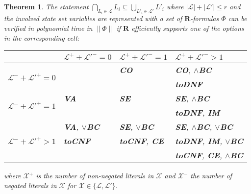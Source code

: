 \documentclass{article}
\newtheorem{theorem}{Theorem}
\newcommand{\ce}{\textbf{CE}}
\newcommand{\im}{\textbf{IM}}
\newcommand{\se}{\textbf{SE}}
\newcommand{\landbc}{\textbf{$\land$BC}}
\newcommand{\co}{\textbf{CO}}
\newcommand{\va}{\textbf{VA}}
\newcommand{\lorbc}{\textbf{$\lor$BC}}
\newcommand{\tocnf}{\textbf{toCNF}}
\newcommand{\todnf}{\textbf{toDNF}}
\begin{document}
\begin{theorem}
The statement $\bigcap_{L_i \in \mathcal L} L_i \subseteq \bigcup_{L'_i \in
\mathcal{L'}} L'_i$ where $|\mathcal L| + |\mathcal L'| \leq r$ and the involved
state set variables are represented with a set of $\mathbf R$-formulas $\Phi$
can be verified in polynomial time in $\|\Phi\|$ if $\mathbf R$ efficiently
supports one of the options in the corresponding cell:

\begin{center}
\begin{tabularx}{0.92\textwidth}{X|X|X|X}
 & $\mathcal L^+ +\mathcal L'^-=0$ 
 & $\mathcal L^+ +\mathcal L'^-=1$ 
 & $\mathcal L^+ +\mathcal L'^->1$\\
 \hline
 \multirow{2}{*}{$\mathcal L^- +\mathcal L'^+=0$}
  &            &\co                            &\co, \landbc                  \\
  &            &                               &\todnf                        \\
 \hline
 \multirow{2}{*}{$\mathcal L^- +\mathcal L'^+=1$}
  &\va         &\se                            &\se, \landbc                  \\
  &            &                               &\todnf, \im                   \\
 \hline
 \multirow{3}{*}{$\mathcal L^- +\mathcal L'^+>1$}
  &\va, \lorbc &\se, \lorbc                    &\se, \landbc, \lorbc          \\
  &\tocnf      &\tocnf, \ce                    &\todnf, \im, \lorbc           \\
  &            &                               &\tocnf, \ce, \landbc          \\
\end{tabularx}
\end{center}
where $\mathcal X^+$ is the number of non-negated literals in $\mathcal X$ and
$\mathcal X^-$ the number of negated literals in $\mathcal X$ for $\mathcal
X \in \{\mathcal L, \mathcal L'\}$.
\label{thm:ps-subsetverification}
\end{theorem}
\end{document}
